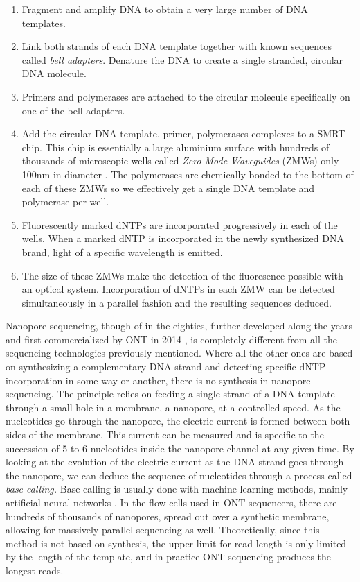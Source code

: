 \documentclass[
  11pt,
  twoside]{scrbook}
\providecommand{\tightlist}{%
  \setlength{\itemsep}{0pt}\setlength{\parskip}{0pt}}
\begin{document}
\begin{enumerate}
\def\labelenumi{\arabic{enumi}.}
\tightlist
\item
  Fragment and amplify DNA to obtain a very large number of DNA templates.
\item
  Link both strands of each DNA template together with known sequences called \emph{bell adapters}. Denature the DNA to create a single stranded, circular DNA molecule.
\item
  Primers and polymerases are attached to the circular molecule specifically on one of the bell adapters.
\item
  Add the circular DNA template, primer, polymerases complexes to a SMRT chip. This chip is essentially a large aluminium surface with hundreds of thousands of microscopic wells called \emph{Zero-Mode Waveguides} (ZMWs) only 100nm in diameter \autocite{leveneZeroModeWaveguidesSingleMolecule2003}. The polymerases are chemically bonded to the bottom of each of these ZMWs so we effectively get a single DNA template and polymerase per well.
\item
  Fluorescently marked dNTPs are incorporated progressively in each of the wells. When a marked dNTP is incorporated in the newly synthesized DNA brand, light of a specific wavelength is emitted.
\item
  The size of these ZMWs make the detection of the fluoresence possible with an optical system. Incorporation of dNTPs in each ZMW can be detected simultaneously in a parallel fashion and the resulting sequences deduced.
\end{enumerate}

Nanopore sequencing, though of in the eighties, further developed along the years \autocite{clarkeContinuousBaseIdentification2009} and first commercialized by ONT in 2014 \autocite{deamerThreeDecadesNanopore2016}, is completely different from all the sequencing technologies previously mentioned. Where all the other ones are based on synthesizing a complementary DNA strand and detecting specific dNTP incorporation in some way or another, there is no synthesis in nanopore sequencing. The principle relies on feeding a single strand of a DNA template through a small hole in a membrane, a nanopore, at a controlled speed. As the nucleotides go through the nanopore, the electric current is formed between both sides of the membrane. This current can be measured and is specific to the succession of 5 to 6 nucleotides inside the nanopore channel at any given time. By looking at the evolution of the electric current as the DNA strand goes through the nanopore, we can deduce the sequence of nucleotides through a process called \emph{base calling.} Base calling is usually done with machine learning methods, mainly artificial neural networks \autocite{wickPerformanceNeuralNetwork2019}. In the flow cells used in ONT sequencers, there are hundreds of thousands of nanopores, spread out over a synthetic membrane, allowing for massively parallel sequencing as well. Theoretically, since this method is not based on synthesis, the upper limit for read length is only limited by the length of the template, and in practice ONT sequencing produces the longest reads.
\end{document}

